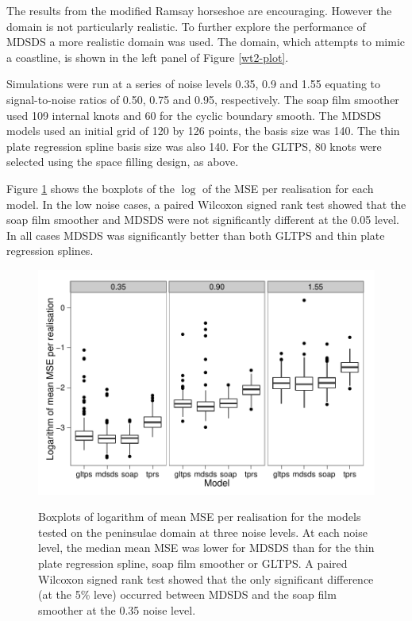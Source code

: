 \documentclass[useAMS, referee]{biom}
\begin{document}
The results from the modified Ramsay horseshoe are encouraging. However the domain is not particularly realistic. To further explore the performance of MDSDS a more realistic domain was used. The domain, which attempts to mimic a coastline, is shown in the left panel of Figure \ref{wt2-plot}.

Simulations were run at a series of noise levels 0.35, 0.9 and 1.55 equating to signal-to-noise ratios of 0.50, 0.75 and 0.95, respectively. The soap film smoother used 109 internal knots and 60 for the cyclic boundary smooth. The MDSDS models used an initial grid of 120 by 126 points, the basis size was 140. The thin plate regression spline basis size was also 140. For the GLTPS, 80 knots were selected using the space filling design, as above.

Figure \ref{wt2-boxplots} shows the boxplots of the $\log$ of the MSE per realisation for each model. In the low noise cases, a paired Wilcoxon signed rank test showed that the soap film smoother and MDSDS were not significantly different at the 0.05 level. In all cases MDSDS was significantly better than both GLTPS and thin plate regression splines.


\begin{figure}
\centering
\includegraphics{examples/wt2/wt2-result.pdf} \\
\caption{Boxplots of logarithm of mean MSE per realisation for the models tested on the peninsulae domain at three noise levels. At each noise level, the median mean MSE was lower for MDSDS than for the thin plate regression spline, soap film smoother or GLTPS. A paired Wilcoxon signed rank test showed that the only significant difference (at the 5\% leve) occurred between MDSDS and the soap film smoother at the 0.35 noise level.}
\label{wt2-boxplots}
\end{figure}
\end{document}
